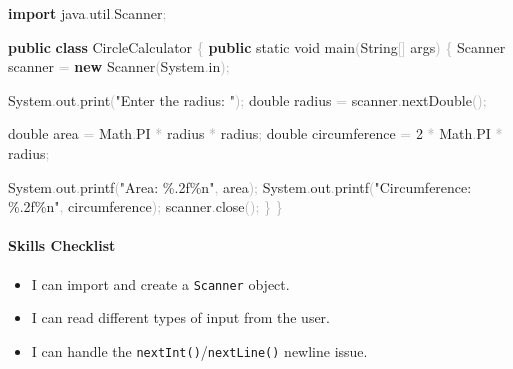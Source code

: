 \documentclass[
  justified,
  openright,
]{tufte-book}
\let\subsection\paragraph
\let\paragraph\paragraph
\newcommand{\KeywordTok}[1]{\textcolor{CodeKeyword}{\textbf{#1}}}  %
\newcommand{\StringTok}[1]{\textcolor{CodeString}{#1}}              %
\newcommand{\CodeNumTok}[1]{\textcolor{CodeNumber}{#1}}             %
\newcommand{\CodeFuncTok}[1]{\textcolor{CodeKeyword}{#1}}           %
\newcommand{\CodeTypeTok}[1]{\textcolor{CodeType}{#1}}              %
\newcommand{\CodeAccentTok}[1]{\textcolor{CodeAccent}{#1}}          %
\newcommand{\OperatorTok}[1]{\textcolor{DarkGray}{#1}}              %
\newenvironment{Shaded}{%
  \begin{mdframed}[style=TufteCode]%
}{%
  \end{mdframed}%
}
\let\subsection\paragraph
\let\paragraph\paragraph
\providecommand{\tightlist}{%
  \setlength{\itemsep}{0pt}\setlength{\parskip}{0pt}}
\begin{document}
\begin{Shaded}
\begin{Highlighting}[]
\KeywordTok{import} \CodeAccentTok{java}\OperatorTok{.}\CodeAccentTok{util}\OperatorTok{.}\CodeAccentTok{Scanner}\OperatorTok{;}
 
\KeywordTok{public} \KeywordTok{class} CircleCalculator \OperatorTok{\{}
    \KeywordTok{public} \CodeTypeTok{static} \CodeTypeTok{void} \CodeFuncTok{main}\OperatorTok{(}String\OperatorTok{[]} args\OperatorTok{)} \OperatorTok{\{}
        Scanner scanner \OperatorTok{=} \KeywordTok{new} Scanner\OperatorTok{(}System\OperatorTok{.}\CodeFuncTok{in}\OperatorTok{);}
 
        System\OperatorTok{.}\CodeFuncTok{out}\OperatorTok{.}\CodeFuncTok{print}\OperatorTok{(}\StringTok{"Enter the radius: "}\OperatorTok{);}
        \CodeTypeTok{double} radius \OperatorTok{=} scanner\OperatorTok{.}\CodeFuncTok{nextDouble}\OperatorTok{();}
 
        \CodeTypeTok{double} area \OperatorTok{=} Math\OperatorTok{.}\CodeFuncTok{PI} \OperatorTok{*} radius \OperatorTok{*} radius\OperatorTok{;}
        \CodeTypeTok{double} circumference \OperatorTok{=} \CodeNumTok{2} \OperatorTok{*} Math\OperatorTok{.}\CodeFuncTok{PI} \OperatorTok{*} radius\OperatorTok{;}
 
        System\OperatorTok{.}\CodeFuncTok{out}\OperatorTok{.}\CodeFuncTok{printf}\OperatorTok{(}\StringTok{"Area: }\StringTok{\%.2f\%n}\StringTok{"}\OperatorTok{,} area\OperatorTok{);}
        System\OperatorTok{.}\CodeFuncTok{out}\OperatorTok{.}\CodeFuncTok{printf}\OperatorTok{(}\StringTok{"Circumference: }\StringTok{\%.2f\%n}\StringTok{"}\OperatorTok{,} circumference\OperatorTok{);}
        scanner\OperatorTok{.}\CodeFuncTok{close}\OperatorTok{();}
    \OperatorTok{\}}
\OperatorTok{\}}
\end{Highlighting}
\end{Shaded}

\subsection{Skills Checklist}\label{skills-checklist-72}

\begin{itemize}
\tightlist
\item[$\square$]
  I can import and create a \texttt{Scanner} object.
\item[$\square$]
  I can read different types of input from the user.
\item[$\square$]
  I can handle the \texttt{nextInt()}/\texttt{nextLine()} newline issue.
\end{itemize}
\end{document}
